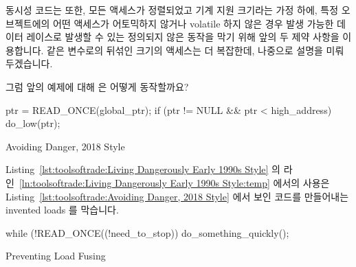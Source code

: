 {{{{동시성 코드는 또한, 모든 액세스가 정렬되었고 기계 지원 크기라는 가정 하에, 특정
오브젝트에의 어떤 액세스가 어토믹하지 않거나 volatile 하지 않은 경우 발생
가능한 데이터 레이스로 발생할 수 있는 정의되지 않은 동작을 막기 위해 앞의 두
제약 사항을 이용합니다.
같은 변수로의 뒤섞인 크기의 액세스는 더 복잡한데, 나중으로 설명을
미뤄두겠습니다.

그럼 앞의 예제에 대해  은 어떻게 동작할까요?

\begin{listing}[tbp]
\begin{linelabel}
\begin{VerbatimL}[commandchars=\\\{\}]
ptr = READ_ONCE(global_ptr);
if (ptr != NULL && ptr < high_address)
	do_low(ptr);
\end{VerbatimL}
\end{linelabel}
\caption{Avoiding Danger, 2018 Style}
\label{lst:toolsoftrade:Avoiding Danger, 2018 Style}
\end{listing}

Listing~\ref{lst:toolsoftrade:Living Dangerously Early 1990s Style} 의
라인~\ref{ln:toolsoftrade:Living Dangerously Early 1990s Style:temp} 에서의
 사용은
Listing~\ref{lst:toolsoftrade:Avoiding Danger, 2018 Style} 에서 보인 코드를
만들어내는 invented loads 를 막습니다.

\begin{listing}[tbp]
\begin{linelabel}
\begin{VerbatimL}[commandchars=\\\{\}]
while (!READ_ONCE((!need_to_stop))
	do_something_quickly();
\end{VerbatimL}
\end{linelabel}
\caption{Preventing Load Fusing}
\label{lst:toolsoftrade:Preventing Load Fusing}
\end{listing}

}}}}
